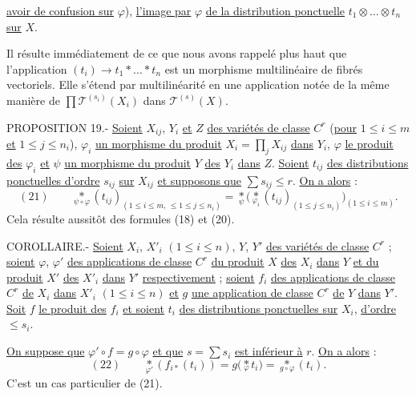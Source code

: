 
\uline{avoir de confusion sur} $\varphi$), \uline{l'image par} $\varphi$ \uline{de la distribution ponctuelle} $t_1\otimes\ldots\otimes t_n$ \uline{sur} $X$.

Il résulte immédiatement de ce que nous avons rappelé plus haut que l'application $(t_i)\longrightarrow t_1*\ldots*t_n$ est un morphisme multilinéaire de fibrés vectoriels. Elle s'étend par multilinéarité en une application notée de la même manière de $\prod\mathcal T^{(s_i)}(X_i)$ dans $\mathcal T^{(s)}(X)$.

PROPOSITION 19.- \uline{Soient} $X_{ij}$, $Y_i$ \uline{et} $Z$ \uline{des variétés de classe} $C^r$ (\uline{pour} $1\leq i\leq m$ \uline{et} $1\leq j\leq n_i$), $\varphi_i$ \uline{un morphisme du produit} $X_i=\prod_j X_{ij}$ \uline{dans} $Y_i$, $\varphi$ \uline{le produit des} $\varphi_i$ \uline{et} $\psi$ \uline{un morphisme du produit} $Y$ \uline{des} $Y_i$ \uline{dans} $Z$. \uline{Soient} $t_{ij}$ \uline{des distributions ponctuelles d'ordre} $s_{ij}$ \uline{sur} $X_{ij}$ \uline{et supposons que} $\sum s_{ij}\leq r$. \uline{On a alors} :
\[
(21)\qquad
\underset{\psi\circ\varphi}{*}(t_{ij})_{(1\leq i\leq m,\,\leq 1\leq j\leq n_i)}
=\underset{\psi}{*}\bigl(\underset{\varphi_i}{*}(t_{ij})_{(1\leq j\leq n_i)}\bigr)_{(1\leq i\leq m)}.
\]
Cela résulte aussitôt des formules (18) et (20).

COROLLAIRE.- \uline{Soient} $X_i$, $X'_i$ $(1\leq i\leq n)$, $Y$, $Y'$ \uline{des variétés de classe} $C^r$ ; \uline{soient} $\varphi$, $\varphi'$ \uline{des applications de classe} $C^r$ \uline{du produit} $X$ \uline{des} $X_i$ \uline{dans} $Y$ \uline{et du produit} $X'$ \uline{des} $X'_i$ \uline{dans} $Y'$ \uline{respectivement} ; \uline{soient} $f_i$ \uline{des applications de classe} $C^r$ \uline{de} $X_i$ \uline{dans} $X'_i$ $(1\leq i\leq n)$ \uline{et} $g$ \uline{une application de classe} $C^r$ \uline{de} $Y$ \uline{dans} $Y'$. \uline{Soit} $f$ \uline{le produit des} $f_i$ \uline{et soient} $t_i$ \uline{des distributions ponctuelles sur} $X_i$, \uline{d'ordre} $\leq s_i$.

\uline{On suppose que} $\varphi'\circ f=g\circ\varphi$ \uline{et que} $s=\sum s_i$ \uline{est inférieur à} $r$. \uline{On a alors} :
\[
(22)\qquad
\underset{\varphi'}{*}(f_{i*}(t_i))=g\bigl(\underset{\varphi}{*}t_i\bigr)=\underset{g\circ\varphi}{*}(t_i).
\]
C'est un cas particulier de (21).
